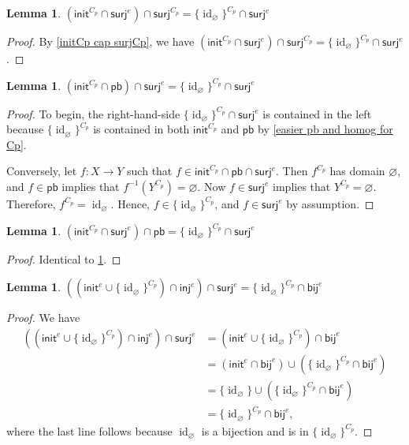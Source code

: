 \documentclass{amsart}
\renewcommand\emptyset\varnothing
\newcommand{\inj}{\mathsf{inj}}
\newcommand{\surj}{\mathsf{surj}}
\newcommand{\bij}{\mathsf{bij}}
\newcommand{\init}{\mathsf{init}}
\newcommand{\pb}{\mathsf{pb}}
\DeclareMathOperator{\id}{id}
\numberwithin{equation}{section}
\newtheorem{lemma}[equation]{Lemma}
\theoremstyle{definition}
\begin{document}
\begin{lemma}
	\label{(initCp cap surje) cap surjCp}
	$\left(\init^{C_p} \cap \surj^e\right) \cap \surj^{C_p} = \{\id_\emptyset\}^{C_p} \cap \surj^e$
\end{lemma}
\begin{proof}
	By \cref{initCp cap surjCp}, we have $\left(\init^{C_p} \cap \surj^e\right) \cap \surj^{C_p} = \{\id_\emptyset\}^{C_p} \cap \surj^e$.
\end{proof}

\begin{lemma}
	\label{(initCp cap pb) cap surje}
	$\left(\init^{C_p} \cap \pb \right) \cap \surj^e = \{\id_\emptyset\}^{C_p} \cap \surj^e$
\end{lemma}
\begin{proof}
	To begin, the right-hand-side $ \{\id_\emptyset\}^{C_p} \cap \surj^e$ is contained in the left because $\{\id_\emptyset\}^{C_p}$ is contained in both $\init^{C_p}$ and $\pb$ by \cref{easier pb and homog for Cp}.

	Conversely, let $f \colon X \to Y$ such that $f \in \init^{C_p} \cap \pb \cap \surj^e$. Then $f^{C_p}$ has domain $\emptyset$, and $f \in \pb$ implies that $f^{-1}(Y^{C_p}) = \emptyset$. Now $f \in \surj^e$ implies that $Y^{C_p} = \emptyset$.  Therefore, $f^{C_p} = \id_\emptyset$. Hence, $f \in \{\id_\emptyset\}^{C_p}$, and $f \in \surj^e$ by assumption.
\end{proof}

\begin{lemma}
	\label{(initCp cap surje) cap pb}
	$\left(\init^{C_p} \cap \surj^e\right) \cap \pb = \{\id_\emptyset\}^{C_p} \cap \surj^e$
\end{lemma}
\begin{proof}
	Identical to \cref{(initCp cap pb) cap surje}.
\end{proof}

\begin{lemma}
	\label{((inite cup idemptyCp) cap inje) cap surje}
	$\left(\left(\init^e \cup \{\id_\emptyset\}^{C_p}\right) \cap \inj^e \right) \cap \surj^e = \{\id_\emptyset\}^{C_p} \cap \bij^e$
\end{lemma}
\begin{proof}
	We have
	\begin{align*}
		\left(\left(\init^e \cup \{\id_\emptyset\}^{C_p}\right) \cap \inj^e \right) \cap \surj^e
		 & =
		\left(\init^e \cup \{\id_\emptyset\}^{C_p}\right) \cap \bij^e
		\\
		 & =
		\left(\init^e \cap \bij^e \right) \cup \left(\{\id_\emptyset\}^{C_p} \cap \bij^e\right)
		\\
		 & =
		\{\id_\emptyset\} \cup \left(\{\id_\emptyset\}^{C_p} \cap \bij^e\right)
		\\
		 & =
		\{\id_\emptyset\}^{C_p} \cap \bij^e,
	\end{align*}
	where the last line follows because $\id_\emptyset$ is a bijection and is in $\{\id_\emptyset\}^{C_p}$.
\end{proof}
\end{document}
